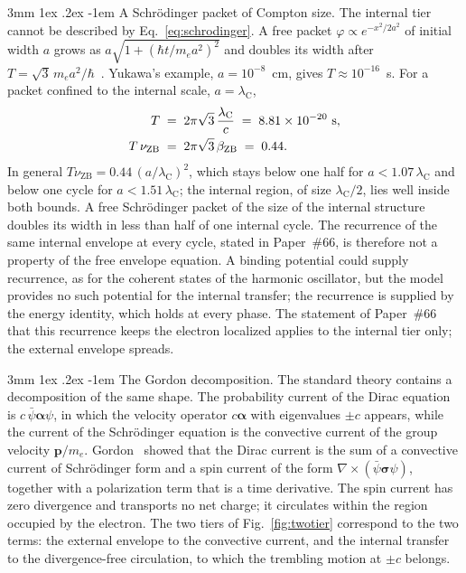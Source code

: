 \documentclass[%
 reprint, amsmath,amssymb, aps, prb, ]{revtex4-2}
\makeatletter
\numberwithin{equation}{section}
\renewcommand\paragraph{%
  \@startsection{paragraph}{4}{\z@}%
    {3mm \@plus 1ex \@minus .2ex}%
    {-1em}%
    {\normalfont\normalsize\itshape}}
\newcommand{\lambdaC}{\lambda_{\mathrm{C}}}
\newcommand{\bZB}{\beta_{\mathrm{ZB}}}
\makeatother
\begin{document}
\paragraph{A Schr\"odinger packet of Compton size.} The internal tier cannot be described by Eq.~\eqref{eq:schrodinger}. A free packet $\varphi \propto e^{-x^2/2a^2}$ of initial width $a$ grows as $a\sqrt{1 + (\hbar t/m_ea^2)^2}$ and doubles its width after $T = \sqrt{3}\,m_ea^2/\hbar$~\cite{Yukawa1954}. Yukawa's example, $a = 10^{-8}$~cm, gives $T \approx 10^{-16}$~s. For a packet confined to the internal scale, $a = \lambdaC$,
\begin{align}
T &\;=\; 2\pi\sqrt{3}\,\frac{\lambdaC}{c} \;=\; 8.81\times10^{-20}\ \text{s},
\notag\\
T\,\nu_{\mathrm{ZB}} &\;=\; 2\pi\sqrt{3}\,\bZB \;=\; 0.44.
\label{eq:doubling}
\end{align}
In general $T\nu_{\mathrm{ZB}} = 0.44\,(a/\lambdaC)^2$, which stays below one half for $a < 1.07\,\lambdaC$ and below one cycle for $a < 1.51\,\lambdaC$; the internal region, of size $\lambdaC/2$, lies well inside both bounds. A free Schr\"odinger packet of the size of the internal structure doubles its width in less than half of one internal cycle. The recurrence of the same internal envelope at every cycle, stated in Paper~\#66, is therefore not a property of the free envelope equation. A binding potential could supply recurrence, as for the coherent states of the harmonic oscillator, but the model provides no such potential for the internal transfer; the recurrence is supplied by the energy identity, which holds at every phase. The statement of Paper~\#66 that this recurrence keeps the electron localized applies to the internal tier only; the external envelope spreads.

\paragraph{The Gordon decomposition.} The standard theory contains a decomposition of the same shape. The probability current of the Dirac equation is $c\,\bar{\psi}\bm{\alpha}\psi$, in which the velocity operator $c\bm{\alpha}$ with eigenvalues $\pm c$ appears, while the current of the Schr\"odinger equation is the convective current of the group velocity $\bm{p}/m_e$. Gordon~\cite{Gordon1928} showed that the Dirac current is the sum of a convective current of Schr\"odinger form and a spin current of the form $\nabla\times(\bar{\psi}\bm{\sigma}\psi)$, together with a polarization term that is a time derivative. The spin current has zero divergence and transports no net charge; it circulates within the region occupied by the electron. The two tiers of Fig.~\ref{fig:twotier} correspond to the two terms: the external envelope to the convective current, and the internal transfer to the divergence-free circulation, to which the trembling motion at $\pm c$ belongs.
\end{document}
